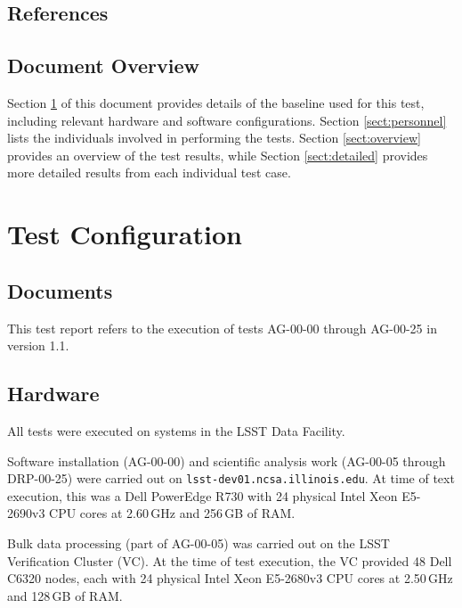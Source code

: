 \documentclass[DM,STR,toc]{lsstdoc}
\begin{document}
\subsection{References}
\label{sect:references}

\renewcommand{\refname}{}


\subsection{Document Overview}
\label{sect:docoverview}

Section \ref{sect:configuration} of this document provides details of the \product{} baseline used for this test, including relevant hardware and software configurations.
Section \ref{sect:personnel} lists the individuals involved in performing the tests.
Section \ref{sect:overview} provides an overview of the test results, while Section \ref{sect:detailed} provides more detailed results from each individual test case.

\section{Test Configuration}
\label{sect:configuration}

\subsection{Documents}

This test report refers to the execution of tests AG-00-00 through AG-00-25 in  version 1.1.

\subsection{Hardware}
\label{sect:hwconf}

All tests were executed on systems in the LSST Data Facility.

Software installation (AG-00-00) and scientific analysis work (AG-00-05 through DRP-00-25) were carried out on \texttt{lsst-dev01.ncsa.illinois.edu}.
At time of text execution, this was a Dell PowerEdge R730 with 24 physical Intel Xeon E5-2690v3 CPU cores at 2.60\,GHz and 256\,GB of RAM.

Bulk data processing (part of AG-00-05) was carried out on the LSST Verification Cluster (VC).
At the time of test execution, the VC provided 48 Dell C6320 nodes, each with 24 physical Intel Xeon E5-2680v3 CPU cores at 2.50\,GHz and 128\,GB of RAM.
\end{document}
